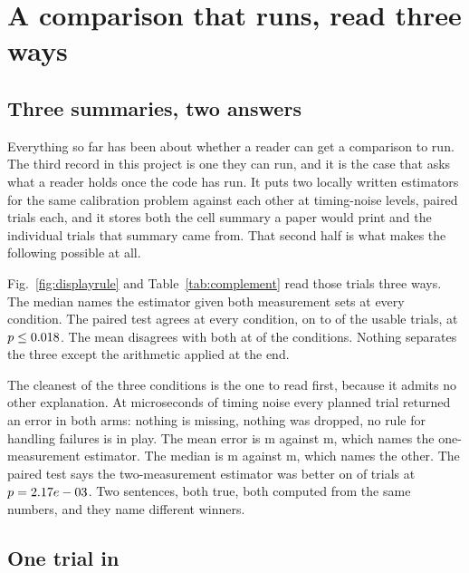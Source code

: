 \section{A comparison that runs, read three ways}
\label{sec:display}

\subsection{Three summaries, two answers}

Everything so far has been about whether a reader can get a comparison to run.
The third record in this project is one they can run, and it is the case that
asks what a reader holds once the code has run. It puts two locally written
estimators for the same calibration problem against each other at
\CxConditions{} timing-noise levels, \CxTrialsPerCondition{} paired trials each,
and it stores both the cell summary a paper would print and the \CxPlanned{}
individual trials that summary came from. That second half is what makes the
following possible at all.

Fig.~\ref{fig:displayrule} and Table~\ref{tab:complement} read those trials
three ways. The median names the estimator given both measurement sets at every
condition. The paired test agrees at every condition, on
\CxPairedWinsLow{} to \CxPairedWinsHigh{} of the usable trials, at
$p \le 0.018{}$. The mean disagrees with both at \CxDisagreeing{} of
the \CxConditions{} conditions. Nothing separates the three except the
arithmetic applied at the end.

The cleanest of the three conditions is the one to read first, because it admits
no other explanation. At \CxCleanSigma{} microseconds of timing noise every
planned trial returned an error in both arms: nothing is missing, nothing was
dropped, no rule for handling failures is in play. The mean error is
\CxCleanMeanFull{} m against \CxCleanMeanReduced{} m, which names the
one-measurement estimator. The median is \CxCleanMedianFull{} m against
\CxCleanMedianReduced{} m, which names the other. The paired test says the
two-measurement estimator was better on \CxCleanWins{} of
\CxTrialsPerCondition{} trials at $p = 2.17e-03{}$. Two sentences, both true,
both computed from the same \CxTrialsPerCondition{} numbers, and they name
different winners.

\subsection{One trial in \CxTrialsPerCondition{}}

